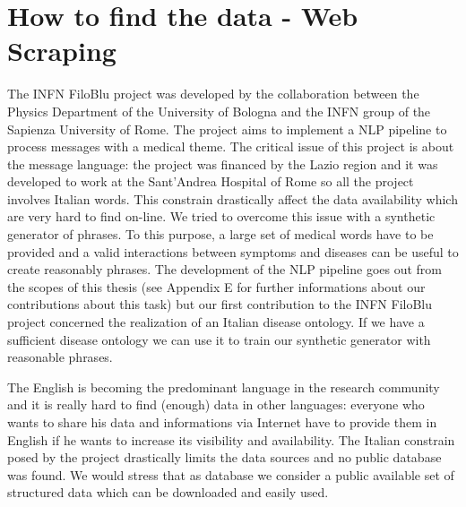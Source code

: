 \documentclass{standalone}
\begin{document}
\section[Web Scraping]{How to find the data - Web Scraping}\label{chimera:web_scraping}

The INFN FiloBlu project was developed by the collaboration between the Physics Department of the University of Bologna and the INFN group of the Sapienza University of Rome.
The project aims to implement a NLP pipeline to process messages with a medical theme.
The critical issue of this project is about the message language: the project was financed by the Lazio region and it was developed to work at the Sant'Andrea Hospital of Rome so all the project involves Italian words.
This constrain drastically affect the data availability which are very hard to find on-line.
We tried to overcome this issue with a synthetic generator of phrases.
To this purpose, a large set of medical words have to be provided and a valid interactions between symptoms and diseases can be useful to create reasonably phrases.
The development of the NLP pipeline goes out from the scopes of this thesis (see Appendix E for further informations about our contributions about this task) but our first contribution to the INFN FiloBlu project concerned the realization of an Italian disease ontology.
If we have a sufficient disease ontology we can use it to train our synthetic generator with reasonable phrases.

The English is becoming the predominant language in the research community and it is really hard to find (enough) data in other languages: everyone who wants to share his data and informations via Internet have to provide them in English if he wants to increase its visibility and availability.
The Italian constrain posed by the project drastically limits the data sources and no public database was found.
We would stress that as database we consider a public available set of structured data which can be downloaded and easily used.
\end{document}
